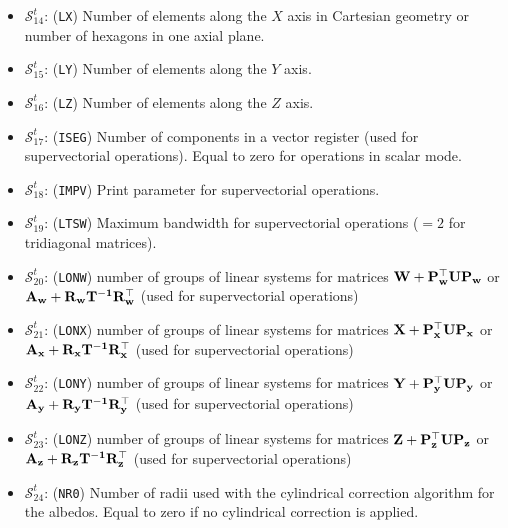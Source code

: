\begin{itemize}
\item $\mathcal{S}^{t}_{14}$: ({\tt LX}) Number of elements along the $X$ axis in Cartesian geometry or number of
hexagons in one axial plane.

\item $\mathcal{S}^{t}_{15}$: ({\tt LY}) Number of elements along the $Y$ axis.

\item $\mathcal{S}^{t}_{16}$: ({\tt LZ}) Number of elements along the $Z$ axis.

\item $\mathcal{S}^{t}_{17}$: ({\tt ISEG}) Number of components in a vector
register (used
for supervectorial operations). Equal to zero for operations in scalar mode.

\item $\mathcal{S}^{t}_{18}$: ({\tt IMPV}) Print parameter for supervectorial operations.

\item $\mathcal{S}^{t}_{19}$: ({\tt LTSW}) Maximum bandwidth for supervectorial operations ($=2$ for
tridiagonal matrices).

\item $\mathcal{S}^{t}_{20}$: ({\tt LONW}) number of groups of linear systems for matrices
$\bf{W}+\bf{P}_w^\top \bf{U}\bf{P}_w$ or $\bf{A}_w+\bf{R}_w\bf{T}^{-1}\bf{R}_w^\top$ (used
for supervectorial operations)

\item $\mathcal{S}^{t}_{21}$: ({\tt LONX})  number of groups of linear systems for matrices
$\bf{X}+\bf{P}_x^\top \bf{U}\bf{P}_x$ or $\bf{A}_x+\bf{R}_x\bf{T}^{-1}\bf{R}_x^\top$ (used
for supervectorial operations)

\item $\mathcal{S}^{t}_{22}$: ({\tt LONY})  number of groups of linear systems for matrices
$\bf{Y}+\bf{P}_y^\top \bf{U}\bf{P}_y$ or $\bf{A}_y+\bf{R}_y\bf{T}^{-1}\bf{R}_y^\top$ (used
for supervectorial operations)

\item $\mathcal{S}^{t}_{23}$: ({\tt LONZ})  number of groups of linear systems for matrices
$\bf{Z}+\bf{P}_z^\top \bf{U}\bf{P}_z$ or $\bf{A}_z+\bf{R}_z\bf{T}^{-1}\bf{R}_z^\top$ (used
for supervectorial operations)

\item $\mathcal{S}^{t}_{24}$: ({\tt NR0}) Number of radii used with the cylindrical correction
algorithm for the albedos. Equal to zero if no cylindrical correction is applied.


\end{itemize}
